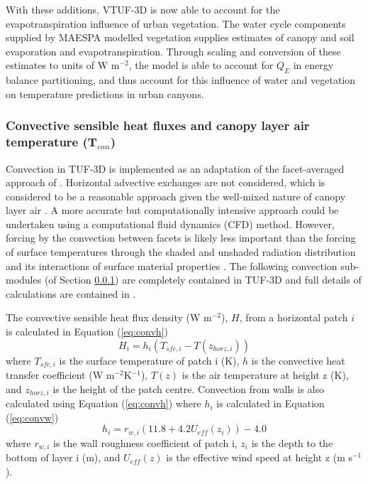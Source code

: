 \documentclass[final,3p,times,authoryear]{elsarticle}
\begin{document}
With these additions, VTUF-3D is now able to account for the evapotranspiration influence of urban vegetation. The water cycle components supplied by MAESPA modelled vegetation supplies estimates of canopy and soil evaporation and evapotranspiration. Through scaling and conversion of these estimates to units of W m$^{-2}$, the model is able to account for $Q_{E}$ in energy balance partitioning, and thus account for this influence of water and vegetation on temperature predictions in urban canyons.


\subsubsection{Convective sensible heat fluxes and canopy layer air temperature (T$_{can}$)}\label{sec:convection} 
Convection in TUF-3D is implemented as an adaptation of the facet-averaged approach of \cite{Masson2000}. Horizontal advective exchanges are not considered, which is considered to be a reasonable approach given the well-mixed nature of canopy layer air \citep{Krayenhoff2007}. A more accurate but computationally intensive approach could be undertaken using a computational fluid dynamics (CFD) method. However, forcing by the convection between facets is likely less important than the forcing of surface temperatures through the shaded and unshaded radiation distribution and its interactions of surface material properties \citep{Krayenhoff2007}. The following convection sub-modules (of Section \ref{sec:convection}) are completely contained in TUF-3D and full details of calculations are contained in \cite{Krayenhoff2007}.

The convective sensible heat flux density (W m$^{-2}$), $H$, from a horizontal patch $i$ is calculated in Equation (\ref{eq:convh})
\begin{equation} 
H_{i} = h_{i} (T_{sfc,i}-T(z_{horz,i}))
\label{eq:convh} \end{equation} 
where $T_{sfc,i}$ is the surface temperature of patch i (K),
$h$ is the convective heat transfer coefficient (W m$^{-2}$K$^{-1}$), 
$T(z)$ is the air temperature at height z (K), and 
$z_{horz,i}$ is the height of the patch centre. Convection from walls is also calculated using Equation (\ref{eq:convh}) where $h_{i}$ is calculated in Equation (\ref{eq:convw})
\begin{equation} 
h_{i} = r_{w,i}(11.8+4.2 U_{eff}(z_{i}))-4.0
\label{eq:convw} \end{equation} 
where 
$r_{w,i}$ is the wall roughness coefficient of patch i,
$z_{i}$ is the depth to the bottom of layer i (m), and
$U_{eff}(z)$ is the effective wind speed at height z (m s$^{-1}$).
\end{document}
